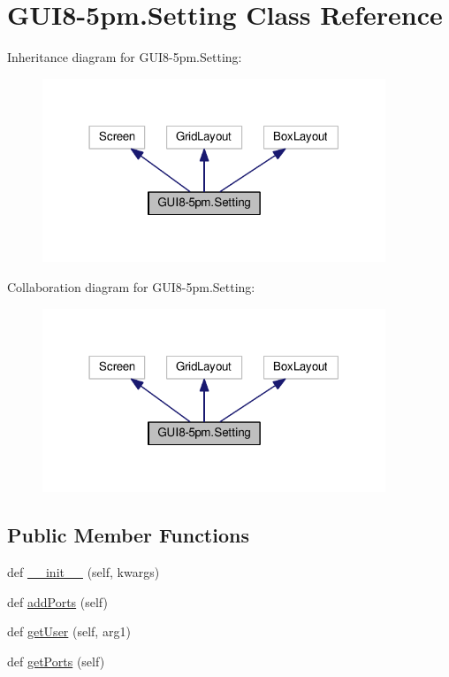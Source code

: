 \hypertarget{classGUI8-5pm_1_1Setting}{}\section{G\+U\+I8-\/5pm.Setting Class Reference}
\label{classGUI8-5pm_1_1Setting}


Inheritance diagram for G\+U\+I8-\/5pm.Setting\+:
\nopagebreak
\begin{figure}[H]
\begin{center}
\leavevmode
\includegraphics[width=291pt]{classGUI8-5pm_1_1Setting__inherit__graph}
\end{center}
\end{figure}


Collaboration diagram for G\+U\+I8-\/5pm.Setting\+:
\nopagebreak
\begin{figure}[H]
\begin{center}
\leavevmode
\includegraphics[width=291pt]{classGUI8-5pm_1_1Setting__coll__graph}
\end{center}
\end{figure}
\subsection*{Public Member Functions}
\begin{DoxyCompactItemize}
\item 
def \hyperlink{classGUI8-5pm_1_1Setting_a29acedf9f6d1fed8c67e37c4df2cf052}{\+\_\+\+\_\+init\+\_\+\+\_\+} (self, kwargs)
\item 
def \hyperlink{classGUI8-5pm_1_1Setting_aebd7039901060675bb62a27394fc7bfa}{add\+Ports} (self)
\item 
def \hyperlink{classGUI8-5pm_1_1Setting_ac5e43e9c3dec5b93ca04c5b3de5c87a7}{get\+User} (self, arg1)
\item 
def \hyperlink{classGUI8-5pm_1_1Setting_ae3058b4bb2dc5e6b305694220f81b9f7}{get\+Ports} (self)
\end{DoxyCompactItemize}
